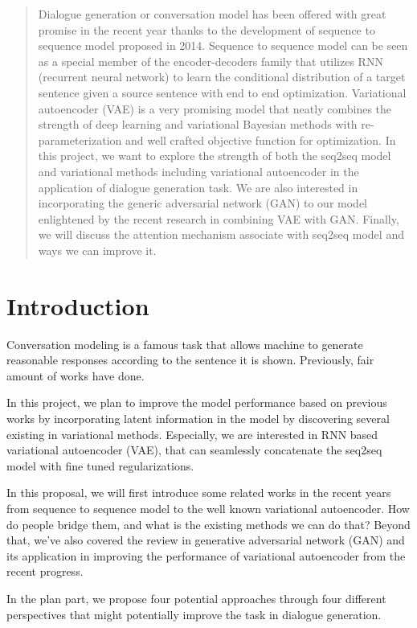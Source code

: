 \documentclass{article}
\begin{document}
\begin{abstract} 
Dialogue generation or conversation model has been offered with great promise in the recent year thanks to the development of sequence to sequence model proposed in 2014. Sequence to sequence model can be seen as a special member of the encoder-decoders family that utilizes RNN (recurrent neural network) to learn the conditional distribution of a target sentence given a source sentence with end to end optimization. Variational autoencoder (VAE) is a very promising model that neatly combines the strength of deep learning and variational Bayesian methods with re-parameterization and well crafted objective function for optimization. In this project, we want to explore the strength of both the seq2seq model and variational methods including variational autoencoder  in the application of dialogue generation task. We are also interested in incorporating the generic adversarial network (GAN) to our model enlightened by the recent research in combining VAE with GAN. Finally, we will discuss the attention mechanism associate with seq2seq model and ways we can improve it.
\end{abstract} 

\section{Introduction}
Conversation modeling is a famous task that allows machine to generate reasonable responses according to the sentence it is shown. Previously, fair amount of works have done.

In this project, we plan to improve the model performance based on previous works by incorporating latent information in the model by discovering several existing in variational methods. Especially, we are interested in RNN based variational autoencoder (VAE), that can seamlessly concatenate the seq2seq model with fine tuned regularizations.

In this proposal, we will first introduce some related works in the recent years from sequence to sequence model to the well known variational autoencoder. How do people bridge them, and what is the existing methods we can do that? Beyond that, we've also covered the review in generative adversarial network (GAN) and its application in improving the performance of variational autoencoder from the recent progress. 

In the plan part, we propose four potential approaches through four different perspectives that might potentially improve the task in dialogue generation.
\end{document}
